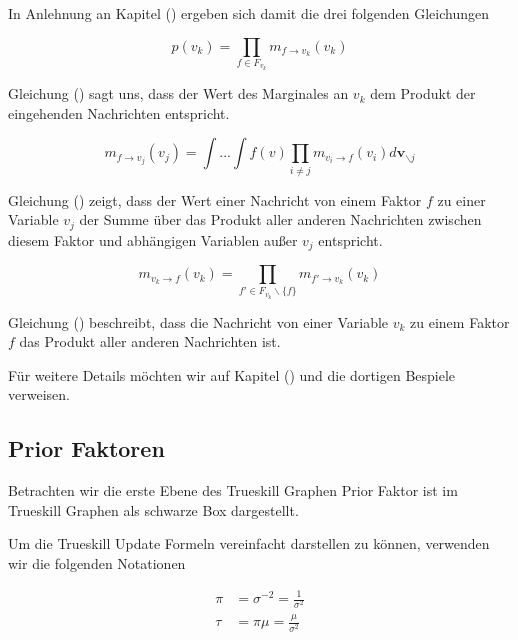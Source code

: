 \documentclass[12pt,a4paper]{scrartcl}
\numberwithin{equation}{section}
\begin{document}
 In Anlehnung an Kapitel () ergeben sich damit die drei folgenden Gleichungen
 
 \begin{equation}
  p(v_k) = \prod_{f \in F_{v_k}}m_{f \rightarrow v_k}(v_k)
 \end{equation}
 
 Gleichung () sagt uns, dass der Wert des Marginales an $v_k$ dem Produkt der eingehenden Nachrichten entspricht. 
 
 \begin{equation}
  m_{f \rightarrow v_j}(v_j) = \int ... \int f(v) \prod_{i \neq j} m_{v_i \rightarrow f}(v_i) d \mathbf{v}_{\backslash j}
 \end{equation}

 Gleichung () zeigt, dass der Wert einer Nachricht von einem Faktor $f$ zu einer Variable $v_j$ der Summe über das Produkt aller anderen Nachrichten zwischen diesem Faktor
 und abhängigen Variablen außer $v_j$ entspricht. 
 
 \begin{equation}
  m_{v_k \rightarrow f}(v_k) =  \prod_{f' \in F_{v_k}\backslash \{f\} }m_{f' \rightarrow v_k}(v_k)
 \end{equation}

 Gleichung () beschreibt, dass die Nachricht von einer Variable $v_k$ zu einem Faktor $f$ das Produkt aller anderen Nachrichten ist. 
 
 Für weitere Details möchten wir auf Kapitel () und die dortigen Bespiele verweisen. 
 
 \subsection{Prior Faktoren}
 
 Betrachten wir die erste Ebene des Trueskill Graphen Prior Faktor ist im Trueskill Graphen als schwarze Box dargestellt. 
 
 
 Um die Trueskill Update Formeln vereinfacht darstellen zu können, verwenden wir die folgenden Notationen
 
 \begin{equation}
  \begin{split}
    \pi &= \sigma^{-2} = \frac{1}{\sigma^2} \\
    \tau &= \pi \mu = \frac{\mu}{\sigma^2} \\
   \end{split} 
 \end{equation}
 
\end{document}
